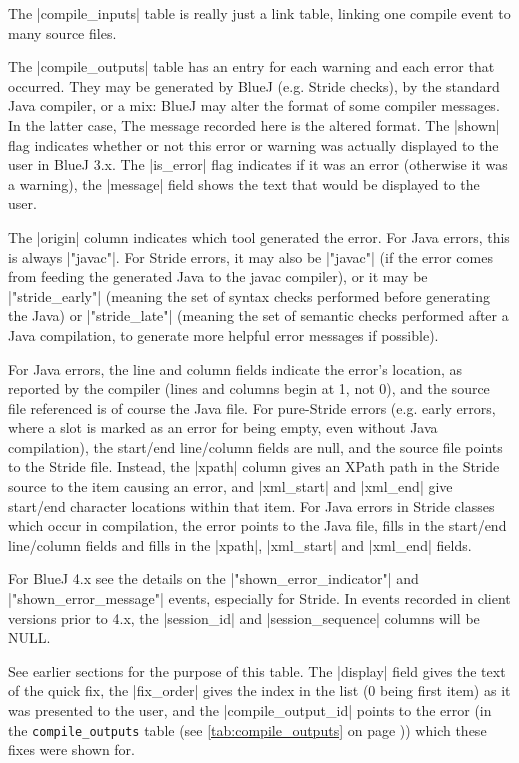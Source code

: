 \documentclass{report}
\newcommand{\myref}[1]{\autoref{#1} on page \pageref*{#1}}
\newcommand{\tabref}[1]{\lstinline|#1| table (see \myref{tab:#1})}
\begin{document}

The |compile_inputs| table is really just a link table, linking one compile
event to many source files.


The |compile_outputs| table has an entry for each warning and each error that
occurred.  They may be generated by BlueJ (e.g. Stride checks), by the standard Java
compiler, or a mix: BlueJ may alter the format of some compiler messages.  In the latter
case, The message recorded here is the altered format. The |shown| flag indicates
whether or not this error or warning was actually displayed to the user in BlueJ 3.x.  The
|is_error| flag indicates if it was an error (otherwise it was a warning), the
|message| field shows the text that would be displayed to the user.

The |origin| column indicates which tool generated the error.  For Java errors, this
is always |"javac"|.  For Stride errors, it may also be |"javac"| (if the error comes from
feeding the generated Java to the javac compiler), or it may be |"stride_early"| (meaning the
set of syntax checks performed before generating the Java) or |"stride_late"| (meaning the
set of semantic checks performed after a Java compilation, to generate more helpful
error messages if possible).

For Java errors, the line and column fields indicate the error's location, as reported by the
compiler  (lines and columns begin at 1, not 0), and the source file referenced is of
course the Java file.  For pure-Stride errors (e.g. early errors, where a slot is marked as
an error for being empty, even without Java compilation), the start/end line/column fields
are null, and the source file points to the Stride file.  Instead, the |xpath| column
gives an XPath path in the Stride source to the item causing an error, and |xml_start| and |xml_end|
give start/end character locations within that item.  For Java errors in Stride classes which
occur in compilation, the error points to the Java file, fills in the start/end line/column fields
and fills in the |xpath|, |xml_start| and |xml_end| fields.

For BlueJ 4.x see the details on the |"shown_error_indicator"| and
|"shown_error_message"| events, especially for Stride.  In events recorded in client versions prior to 4.x,
the |session_id| and |session_sequence| columns will be NULL.


See earlier sections for the purpose of this table.  The |display| field gives the text of the
quick fix, the |fix_order| gives the index in the list (0 being first item) as it was presented
to the user, and the |compile_output_id| points to the error (in the \tabref{compile_outputs})
which these fixes were shown for.
\end{document}
